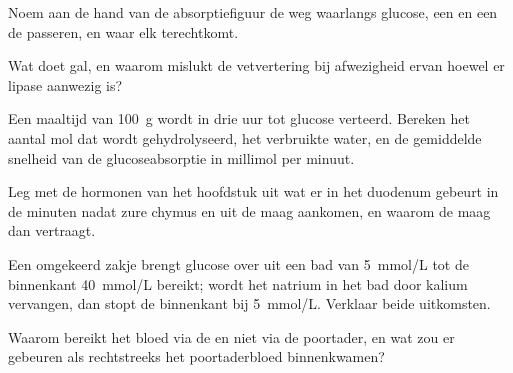 \begin{exercise}[$\star$]\label{exo:b1:digestion-absorption:3}
Noem aan de hand van de absorptiefiguur de weg waarlangs glucose, een
 en een  de  passeren, en waar elk terechtkomt.
\end{exercise}

\begin{exercise}[$\star$]\label{exo:b1:digestion-absorption:4}
Wat doet gal, en waarom mislukt de vetvertering bij afwezigheid ervan
hoewel er lipase aanwezig is?
\end{exercise}

\begin{exercise}[$\star\star$]\label{exo:b1:digestion-absorption:5}
Een maaltijd van \qty{100}{g}  wordt in drie uur tot glucose
verteerd. Bereken het aantal mol  dat wordt
gehydrolyseerd, het verbruikte water, en de gemiddelde snelheid van de
glucoseabsorptie in millimol per minuut.
\end{exercise}

\begin{exercise}[$\star\star$]\label{exo:b1:digestion-absorption:6}
Leg met de hormonen van het hoofdstuk uit wat er in het duodenum gebeurt in
de minuten nadat zure chymus en  uit de maag aankomen, en waarom de maag
dan vertraagt.
\end{exercise}

\begin{exercise}[$\star\star$]\label{exo:b1:digestion-absorption:7}
Een omgekeerd zakje brengt glucose over uit een bad van \qty{5}{mmol/L}
tot de binnenkant \qty{40}{mmol/L} bereikt; wordt het natrium in het bad
door kalium vervangen, dan stopt de binnenkant bij \qty{5}{mmol/L}.
Verklaar beide uitkomsten.
\end{exercise}

\begin{exercise}[$\star\star$]\label{exo:b1:digestion-absorption:8}
Waarom bereikt  het bloed via de  en niet via de poortader, en wat
zou er gebeuren als  rechtstreeks het poortaderbloed
binnenkwamen?
\end{exercise}

